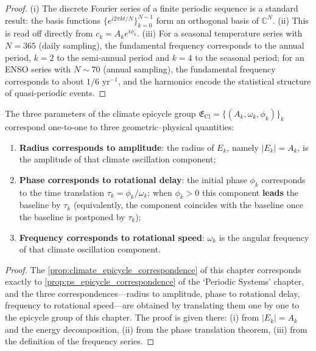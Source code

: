 \begin{proof}
(i) The discrete Fourier series of a finite periodic sequence is a standard result: the basis functions $\{e^{i2\pi kt/N}\}_{k=0}^{N-1}$ form an orthogonal basis of $\mathbb C^N$.
(ii) This is read off directly from $c_k=A_k e^{i\phi_k}$.
(iii) For a seasonal temperature series with $N=365$ (daily sampling), the fundamental frequency corresponds to the annual period, $k=2$ to the semi-annual period and $k=4$ to the seasonal period; for an ENSO series with $N\sim70$ (annual sampling), the fundamental frequency corresponds to about $1/6$ yr$^{-1}$, and the harmonics encode the statistical structure of quasi-periodic events.
\end{proof}

\begin{proposition}\label{prop:climate_epicycle_correspondence}
The three parameters of the climate epicycle group $\mathfrak E_{\mathrm{Cl}}=\{(A_k,\omega_k,\phi_k)\}_{k}$ correspond one-to-one to three geometric--physical quantities:
\begin{enumerate}[label=(\roman*)]
    \item \textbf{Radius corresponds to amplitude}: the radius of $E_k$, namely $|E_k|=A_k$, is the amplitude of that climate oscillation component;
    \item \textbf{Phase corresponds to rotational delay}: the initial phase $\phi_k$ corresponds to the time translation $\tau_k=\phi_k/\omega_k$; when $\phi_k>0$ this component \textbf{leads} the baseline by $\tau_k$ (equivalently, the component coincides with the baseline once the baseline is postponed by $\tau_k$);
    \item \textbf{Frequency corresponds to rotational speed}: $\omega_k$ is the angular frequency of that climate oscillation component.
\end{enumerate}
\end{proposition}

\begin{proof}
The \cref{prop:climate_epicycle_correspondence} of this chapter corresponds exactly to \cref{prop:ps_epicycle_correspondence} of the `Periodic Systems' chapter,
and the three correspondences---radius to amplitude, phase to rotational delay, frequency to rotational speed---are obtained by translating them one by one to the epicycle group of this chapter.
The proof is given there: (i) from $|E_k|=A_k$ and the energy decomposition, (ii) from the phase translation theorem, (iii) from the definition of the frequency series.
\end{proof}


